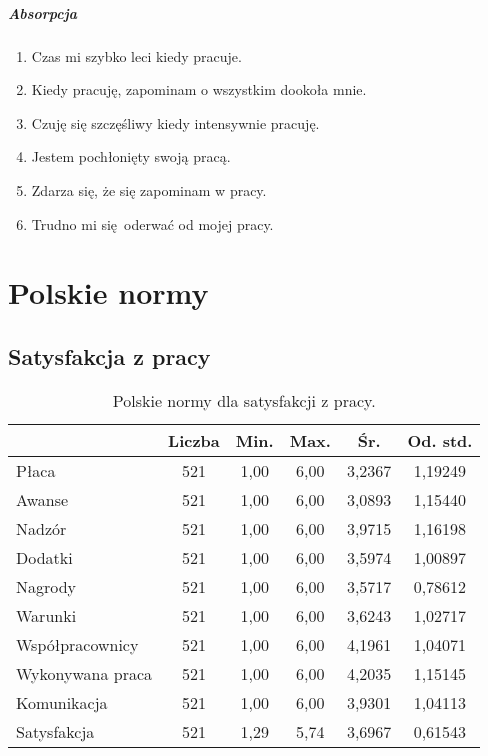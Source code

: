 \paragraph{Absorpcja}
\begin{enumerate}
  \item Czas mi szybko leci kiedy pracuje.
  \item Kiedy pracuję, zapominam o wszystkim dookoła mnie.
  \item Czuję się szczęśliwy kiedy intensywnie pracuję.
  \item Jestem pochłonięty swoją pracą.
  \item Zdarza się, że się zapominam w pracy.
  \item Trudno mi się oderwać od mojej pracy.
\end{enumerate}
\cleardoublepage
\chapter{Polskie normy}
\section{Satysfakcja z pracy}
\label{sec:app-jss-norms}

\begin{table}[h!]
\begin{center}
\begin{tabular}{l | c c c c c}
  & Liczba & Min. & Max. & Śr. & Od. std. \\ \hline
Płaca & 521 & 1,00 & 6,00 & 3,2367 & 1,19249 \\
Awanse & 521 & 1,00 & 6,00 & 3,0893 & 1,15440 \\ 
Nadzór &  521 & 1,00 & 6,00 & 3,9715 & 1,16198 \\
Dodatki &  521 & 1,00 & 6,00 & 3,5974 & 1,00897 \\
Nagrody &  521 & 1,00 & 6,00 & 3,5717 & 0,78612 \\
Warunki &  521 & 1,00 & 6,00 & 3,6243 & 1,02717 \\
Współpracownicy &  521 & 1,00 & 6,00 & 4,1961 & 1,04071 \\
Wykonywana praca &  521 & 1,00 & 6,00 & 4,2035 & 1,15145 \\
Komunikacja & 521 & 1,00 & 6,00 & 3,9301 & 1,04113 \\ \hline
Satysfakcja & 521 & 1,29 & 5,74 & 3,6967 & 0,61543 \\
\end{tabular}
\end{center}
\caption{Polskie normy dla satysfakcji z pracy.}
\label{tab:jss-pl-norms}
\end{table}

